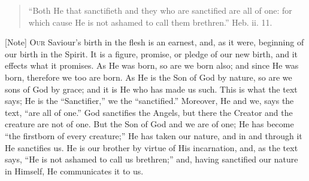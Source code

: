 
\begin{quote}

``Both He that sanctifieth and they who are sanctified are
all of one: for which cause He is not ashamed to call them
brethren.'' Heb. ii. 11.

\end{quote}

[Note] O\textsc{ur} Saviour's birth in
the flesh is an earnest, and, as it were, beginning of our birth in
the Spirit. It is a figure, promise, or pledge of our new birth, and
it effects what it promises. As He was born, so are we born also; and
since He was born, therefore we too are born. As He is the Son of God
by nature, so are we sons of God by grace; and it is He who has made
us such. This is what the text says; He is the ``Sanctifier,''
we the ``sanctified.'' Moreover, He and we, says the text,
``are all of one.'' God sanctifies the Angels, but there the
Creator and the creature are not of one. But the Son of God and we are
of one; He has become ``the firstborn of every creature;'' He
has taken our nature, and in and through it He sanctifies us. He is
our brother by virtue of His incarnation, and, as the text says,
``He is not ashamed to call us brethren;'' and, having
sanctified our nature in Himself, He communicates it to us.

